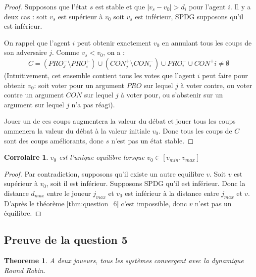 \documentclass[12pt]{article}
\newtheorem{theoreme}{Theoreme}[section]
\newtheorem{corollary}{Corrolaire}[section]
\theoremstyle{defi}
\theoremstyle{not}
\theoremstyle{prob}
\begin{document}
    \begin{proof}
      Supposons que l'état $s$ est stable et que $|v_s - v_0| > d_i$ pour l'agent $i$.
      Il y a deux cas : soit $v_s$ est supérieur à $v_0$ soit $v_s$ est inférieur, SPDG supposons qu'il est inférieur.

      On rappel que l'agent $i$ peut obtenir exactement $v_0$ en annulant tous les coups de son adversaire $j$.
      Comme $v_s<v_0$, on a :
      $$
      C = (PRO^-_j \setminus PRO^+_i) \cup (CON^+_j \setminus CON^-_i) \cup PRO^-_i \cup CON^+i \not = \emptyset
      $$
      (Intuitivement, cet ensemble contient tous les votes que l'agent $i$ peut faire pour obtenir $v_0$: soit voter pour un argument $PRO$ sur lequel $j$ à voter contre, ou voter contre un argument $CON$ sur lequel $j$ à voter pour, ou s'abstenir sur un argument sur lequel $j$ n'a pas réagi).

      Jouer un de ces coups augmentera la valeur du débat et jouer tous les coups ammenera la valeur du débat à la valeur initiale $v_0$. Donc tous les coups de $C$ sont des coups améliorants, donc $s$ n'est pas un état stable.
    \end{proof}

    \begin{corollary}
      $v_0$ est l'\emph{unique} equilibre lorsque $v_0 \in [v_{min},v_{max}]$
    \end{corollary}

    \begin{proof}
      Par contradiction, supposons qu'il existe un autre equilibre $v$.
      Soit $v$ est supérieur à $v_0$, soit il est inférieur.
      Supposons SPDG qu'il est inférieur.
      Donc la distance $d_{max}$ entre le joueur $j_{max}$ et $v_0$ est inférieur à la distance entre $j_{max}$ et $v$.
      D'après le théorème \ref{thm:question_6} c'est impossible, donc $v$ n'est pas un équilibre.
    \end{proof}

    \subsection{Preuve de la question 5}

      \begin{theoreme}
        \label{thm:question_5}
        A deux joueurs, tous les systèmes convergent avec la dynamique Round Robin.
      \end{theoreme}
\end{document}
